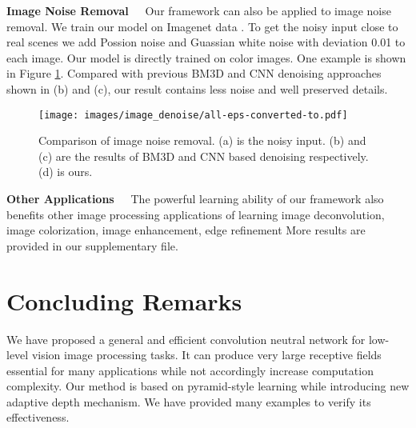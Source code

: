 \documentclass[10pt,twocolumn,letterpaper]{article}
\begin{document}
\vspace{0.1in}\noindent\textbf{Image Noise Removal~~} Our framework can also be applied
to image noise removal. We train our model on Imagenet data \cite{RussakovskyDSKS15}. To
get the noisy input close to real scenes we add Possion noise and Guassian white noise
with deviation 0.01 to each image. Our model is directly trained on color images. One
example is shown in Figure \ref{fig:image_noise_removal}. Compared with previous BM3D
\cite{Dabov2007} and CNN denoising \cite{RenX15} approaches shown in (b) and (c), our
result contains less noise and well preserved details.

\begin{figure}[t]
\centering
\texttt{[image: images/image\_denoise/all-eps-converted-to.pdf]}\\
\caption{Comparison of image noise removal. (a) is the noisy input. (b) and (c) are the
results of BM3D \cite{Dabov2007} and CNN based denoising \cite{RenX15} respectively. (d)
is ours. } \label{fig:image_noise_removal}
\end{figure}

\vspace{0.1in}\noindent\textbf{Other Applications~~} The powerful learning ability of our
framework also benefits other image processing applications of learning image
deconvolution, image colorization, image enhancement, edge refinement \etc More results are provided in
our supplementary file.

\section{Concluding Remarks}

We have proposed a general and efficient convolution neutral network for low-level vision
image processing tasks. It can produce very large receptive fields essential for many
applications while not accordingly increase computation complexity. Our method is based
on pyramid-style learning while introducing new adaptive depth mechanism. We have
provided many examples to verify its effectiveness.


{\small


}
\end{document}
